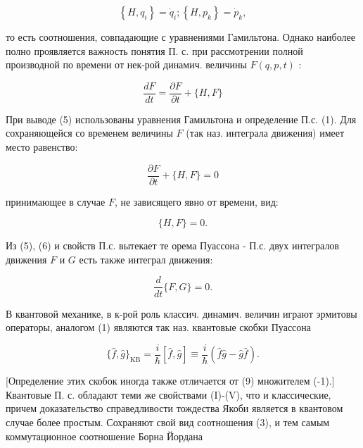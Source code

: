 \documentclass[10pt]{article}
\begin{document}
\[

\left\{H, q_{i}\right\}=\dot{q}_{i} ;\left\{H, p_{k}\right\}=\dot{p}_{k},

\]



то есть соотношения, совпадающие с уравнениями Гамильтона. Однако наиболее полно проявляется важность понятия П. с. при рассмотрении полной производной по времени от нек-рой динамич. величины $F(q, p, t)$ :



\[

\frac{d F}{d t}=\frac{\partial F}{\partial t}+\{H, F\}

\]



При выводе (5) использованы уравнения Гамильтона и определение П.с. (1). Для сохраняющейся со временем величины $F$ (так наз. интеграла движения) имеет место равенство:



\[

\frac{\partial F}{\partial t}+\{H, F\}=0

\]



принимающее в случае $F$, не зависящего явно от времени, вид:



\[

\{H, F\}=0 .

\]



Из (5), (6) и свойств П.с. вытекает те орема Пуассона - П.с. двух интегралов движения $F$ и $G$ есть также интеграл движения:



\[

\frac{d}{d t}\{F, G\}=0 .

\]



В квантовой механике, в к-рой роль классич. динамич. величин играют эрмитовы операторы, аналогом (1) являются так наз. квантовые скобки Пуассона



\[

\{\hat{f}, \hat{g}\}_{\mathrm{KB}}=\frac{i}{\hbar}[\hat{f}, \hat{g}] \equiv \frac{i}{\hbar}(\hat{f} \hat{g}-\hat{g} \hat{f}) .

\]



[Определение этих скобок иногда также отличается от (9) множителем (-1).] Квантовые П. с. обладают теми же свойствами (I)-(V), что и классические, причем доказательство справедливости тождества Якоби является в квантовом случае более простым. Сохраняют свой вид соотношения (3), и тем самым коммутационное соотношение Борна Йордана
\end{document}
